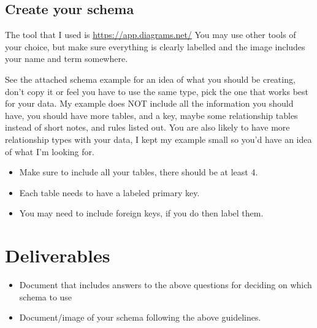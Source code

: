 \documentclass[12pt]{article}
\begin{document}
\subsection*{Create your schema}

The tool that I used is \url{https://app.diagrams.net/} 
You may use other tools of your choice, but make sure everything is clearly labelled and the image includes your name and term somewhere.

See the attached schema example for an idea of what you should be creating, don't copy it or feel you have to use the same type, pick the one that works best for your data. My example does NOT include all the information you should have, you should have more tables, and a key, maybe some relationship tables instead of short notes, and rules listed out. You are also likely to have more relationship types with your data, I kept my example small so you'd have an idea of what I'm looking for.

\begin{itemize}
    \item Make sure to include all your tables, there should be at least 4.  
    \item Each table needs to have a labeled primary key.  
    \item You may need to include foreign keys, if you do then label them.
\end{itemize}


\section*{Deliverables}
\begin{itemize}
        \item Document that includes answers to the above questions for deciding on which schema to use
        \item Document/image of your schema following the above guidelines.
\end{itemize}
\end{document}
